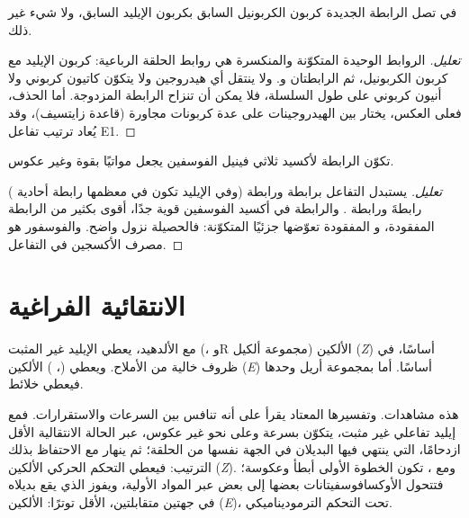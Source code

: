 \begin{proposition}\label{prop:b2:wittig:regiospecific}
في  تصل الرابطة  الجديدة كربون الكربونيل السابق بكربون الإيليد السابق،
ولا شيء غير ذلك.
\end{proposition}

\begin{proof}[تعليل]
الروابط الوحيدة المتكوّنة والمنكسرة هي روابط الحلقة الرباعية: كربون الإيليد مع كربون
الكربونيل، ثم الرابطتان  و. ولا ينتقل أي هيدروجين ولا يتكوّن كاتيون كربوني ولا أنيون كربوني
على طول السلسلة، فلا يمكن أن تنزاح الرابطة المزدوجة. أما الحذف، فعلى العكس، يختار بين
الهيدروجينات على عدة كربونات مجاورة (قاعدة زايتسيف)، وقد يُعاد ترتيب تفاعل E1.
\end{proof}

\begin{proposition}\label{prop:b2:wittig:driving}
تكوّن الرابطة  لأكسيد ثلاثي فينيل الفوسفين يجعل  مواتيًا بقوة
وغير عكوس.
\end{proposition}

\begin{proof}[تعليل]
يستبدل التفاعل برابطة  ورابطة  (وفي الإيليد تكون  في معظمها رابطة أحادية
) رابطةَ  ورابطة . والرابطة  في أكسيد الفوسفين
قوية جدًا، أقوى بكثير من الرابطة  المفقودة، و المفقودة تعوّضها جزئيًا
 المتكوّنة: فالحصيلة نزول واضح. والفوسفور هو مصرف الأكسجين في
التفاعل.
\end{proof}

\section{الانتقائية الفراغية}

\begin{proposition}\label{prop:b2:wittig:stereo}
مع الألدهيد، يعطي الإيليد غير المثبت (، وR مجموعة ألكيل) الألكين (\textit{Z}) أساسًا،
في ظروف خالية من الأملاح. ويعطي  (، ) الألكين
(\textit{E}) أساسًا. أما  بمجموعة أريل وحدها فيعطي خلائط.
\end{proposition}

\admitted

هذه مشاهدات. وتفسيرها المعتاد يقرأ  على أنه تنافس بين
السرعات والاستقرارات. فمع إيليد تفاعلي غير مثبت، يتكوّن  بسرعة 
وعلى نحو غير عكوس، عبر الحالة الانتقالية الأقل ازدحامًا، التي ينتهي فيها البديلان في
الجهة نفسها من الحلقة؛ ثم ينهار مع الاحتفاظ بذلك الترتيب: فيعطي التحكم الحركي
الألكين (\textit{Z}). ومع ، تكون الخطوة الأولى أبطأ وعكوسة؛ فتتحول
الأوكسافوسفيتانات بعضها إلى بعض عبر المواد الأولية، ويفوز الذي يقع بديلاه في
جهتين متقابلتين، الأقل توترًا: الألكين (\textit{E})، تحت التحكم الترموديناميكي.

